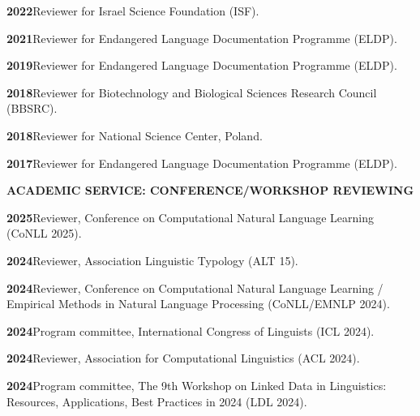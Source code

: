 \documentclass[11pt]{article}
\newcommand{\hangpara}{
 \setlength{\parindent}{0in} %
 \hangindent=0.42in %
}
\begin{document}
\vskip 6pt
\hangpara
{\bf 2022}\hspace{1ex}Reviewer for Israel Science Foundation (ISF).

\vskip 6pt
\hangpara
{\bf 2021}\hspace{1ex}Reviewer for Endangered Language Documentation Programme (ELDP).

\vskip 6pt
\hangpara
{\bf 2019}\hspace{1ex}Reviewer for Endangered Language Documentation Programme (ELDP).

\vskip 6pt
\hangpara
{\bf 2018}\hspace{1ex}Reviewer for Biotechnology and Biological Sciences Research Council (BBSRC).

\vskip 6pt
\hangpara
{\bf 2018}\hspace{1ex}Reviewer for National Science Center, Poland.

\vskip 6pt
\hangpara
{\bf 2017}\hspace{1ex}Reviewer for Endangered Language Documentation Programme (ELDP).

\begin{flushleft}
{\bf ACADEMIC SERVICE: CONFERENCE/WORKSHOP REVIEWING}
\end{flushleft}


\hangpara
{\bf 2025}\hspace{1ex}Reviewer, Conference on Computational Natural Language Learning (CoNLL 2025).

\hangpara
\vskip 6pt
{\bf 2024}\hspace{1ex}Reviewer, Association Linguistic Typology (ALT 15).

\hangpara
\vskip 6pt
{\bf 2024}\hspace{1ex}Reviewer, Conference on Computational Natural Language Learning / Empirical Methods in Natural Language Processing (CoNLL/EMNLP 2024).

\hangpara
\vskip 6pt
{\bf 2024}\hspace{1ex}Program committee, International Congress of Linguists (ICL 2024).

\hangpara
\vskip 6pt
{\bf 2024}\hspace{1ex}Reviewer, Association for Computational Linguistics (ACL 2024).

\hangpara
\vskip 6pt
{\bf 2024}\hspace{1ex}Program committee, The 9th Workshop on Linked Data in Linguistics: Resources, Applications, Best Practices in 2024 (LDL 2024).
\end{document}
